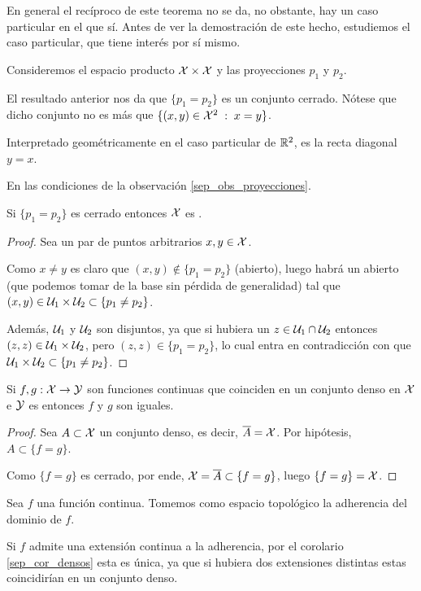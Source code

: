 En general el recíproco de este teorema no se da, no obstante, hay un caso particular en el que sí. Antes de ver la demostración de este hecho, estudiemos el caso particular, que tiene interés por sí mismo.
\begin{obs}[Proyecciones]
	\label{sep_obs_proyecciones}
	Consideremos el espacio producto $\mathcal{X}\times \mathcal{X}$ y las proyecciones $p_1$ y $p_2$.
	
	El resultado anterior nos da que $\{p_1=p_2\}$ es un conjunto cerrado. Nótese que dicho conjunto no es más que $\{(x,y)\in\mathcal{X}^2\;:\; x=y\}$.
	
	Interpretado geométricamente en el caso particular de $\mathbb{R}^2$, es la recta diagonal $y=x$.
\end{obs}
\begin{lem}[Recíproco]
	En las condiciones de la observación \ref{sep_obs_proyecciones}.
	
	Si $\{p_1 = p_2\}$ es cerrado entonces $\mathcal{X}$ es \hausdorff.
\end{lem}
\begin{proof}
	Sea un par de puntos arbitrarios $x,y\in\mathcal{X}$.
	
	Como $x\not= y$ es claro que $(x,y)\not\in\{p_1=p_2\}$ (abierto), luego habrá un abierto (que podemos tomar de la base sin pérdida de generalidad) tal que $(x,y)\in\mathcal{U}_1\times\mathcal{U}_2\subset\{p_1\not=p_2\}$.
	
	Además, $\mathcal{U}_1$ y $\mathcal{U}_2$ son disjuntos, ya que si hubiera un $z\in\mathcal{U}_1\cap\mathcal{U}_2$ entonces $(z,z)\in\mathcal{U}_1\times\mathcal{U}_2$, pero $(z,z)\in \{p_1=p_2\}$, lo cual entra en contradicción con que $\mathcal{U}_1\times\mathcal{U}_2\subset \{p_1\not=p_2\}$.
\end{proof}
\begin{cor}[Densos]
	\label{sep_cor_densos}
	Si $f,g:\mathcal{X}\to \mathcal{Y}$ son funciones continuas que coinciden en un conjunto denso en $\mathcal{X}$ e $\mathcal{Y}$ es \hausdorff entonces $f$ y $g$ son iguales. 
\end{cor}
\begin{proof}
	Sea $A\subset \mathcal{X}$ un conjunto denso, es decir, $\overline{A}=\mathcal{X}$. Por hipótesis, $A\subset \{f=g\}$.
	
	Como $\{f=g\}$ es cerrado, por ende, $\mathcal{X}=\overline{A}\subset \{f=g\}$, luego $\{f=g\}=\mathcal{X}$.
	\end{proof}
\begin{obs}
	Sea $f$ una función continua. Tomemos como espacio topológico la adherencia del dominio de $f$.
	
	Si $f$ admite una extensión continua a la adherencia, por el corolario \ref{sep_cor_densos} esta es única, ya que si hubiera dos extensiones distintas estas coincidirían en un conjunto denso. 
\end{obs}
